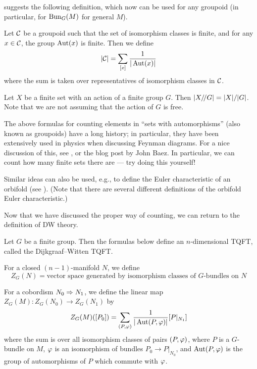  suggests the following definition, which now
can be used for any groupoid (in particular, for $\Bun_G(M)$ for general $M$).
\begin{definition}\label{d:count}
  Let $\calC$ be a groupoid such that the set of isomorphism classes is finite,
  and for any $x\in \calC$, the group
  $\Aut(x)$ is finite. Then we define
  $$
  |\calC|=\sum_{[x]} \frac{1}{|\Aut(x)|}
  $$
  where the sum is taken over representatives of isomorphism classes in $\calC$.
\end{definition}
\begin{example}\label{x:action-groupoid}
  Let $X$ be a finite set with an action of a finite group $G$.
  Then $|X\q G|=|X|/|G|$. Note that we are not assuming that the
  action of $G$ is free.
\end{example}
The above formulas for counting elements in ``sets with automorphisms'' (also
known as groupoids) have a long history; in particular, they have been
extensively used in physics when discussing Feynman diagrams. For a nice
discussion of this, see \cite{baez-dolan-finite-sets}, or the blog post
\cite{baez-counting} by John Baez. In particular, we can count how many finite
sets there are --- try doing this yourself!


Similar ideas can also be used, e.g., to define the Euler characteristic of
an orbifold (see \cite[Section 2.4]{caramello}). (Note that there are several
different definitions of the orbifold Euler characteristic.)

Now that we have discussed the proper way of counting, we can return to the
definition of DW theory.

\begin{theorem}\label{t:DW}
  Let $G$ be a finite group. Then the formulas below define an
  $n$-dimensional TQFT, called the Dijkgraaf--Witten TQFT.

  For a closed $(n-1)$-manifold $N$, we define
  $$
    Z_G(N)=\text{vector space generated by isomorphism classes of
                  $G$-bundles on $N$}
  $$

  For a cobordism $N_0\cob{M}N_1$, we define the linear map
  $Z_G(M)\colon Z_G(N_0)\to Z_G(N_1)$ by
  \begin{equation}\label{e:DWmain}
    Z_G(M)([P_0])=\sum_{(P, \ph)} \frac{1}{|\Aut(P,\ph)|} [P|_{N_1}]
  \end{equation}
  where the sum is over all isomorphism classes of pairs $(P, \ph)$, where
  $P$ is a $G$-bundle on $M$, $\ph$ is an isomorphism of
  bundles $P_0\to P|_{N_0}$, and $\Aut(P, \ph)$ is the group of
  automorphisms of $P$ which commute with $\ph$.
\end{theorem}

